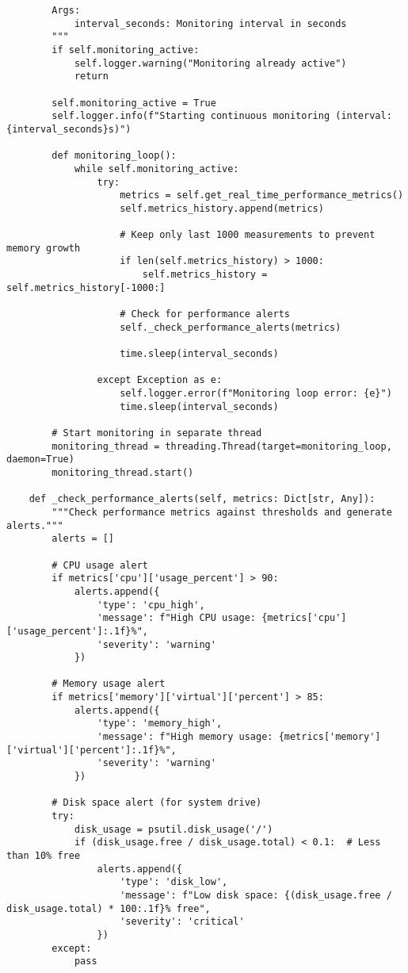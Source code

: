 \documentclass[12pt,a4paper]{article}
\begin{document}
\begin{verbatim}
        Args:
            interval_seconds: Monitoring interval in seconds
        """
        if self.monitoring_active:
            self.logger.warning("Monitoring already active")
            return
        
        self.monitoring_active = True
        self.logger.info(f"Starting continuous monitoring (interval: {interval_seconds}s)")
        
        def monitoring_loop():
            while self.monitoring_active:
                try:
                    metrics = self.get_real_time_performance_metrics()
                    self.metrics_history.append(metrics)
                    
                    # Keep only last 1000 measurements to prevent memory growth
                    if len(self.metrics_history) > 1000:
                        self.metrics_history = self.metrics_history[-1000:]
                    
                    # Check for performance alerts
                    self._check_performance_alerts(metrics)
                    
                    time.sleep(interval_seconds)
                    
                except Exception as e:
                    self.logger.error(f"Monitoring loop error: {e}")
                    time.sleep(interval_seconds)
        
        # Start monitoring in separate thread
        monitoring_thread = threading.Thread(target=monitoring_loop, daemon=True)
        monitoring_thread.start()
    
    def _check_performance_alerts(self, metrics: Dict[str, Any]):
        """Check performance metrics against thresholds and generate alerts."""
        alerts = []
        
        # CPU usage alert
        if metrics['cpu']['usage_percent'] > 90:
            alerts.append({
                'type': 'cpu_high',
                'message': f"High CPU usage: {metrics['cpu']['usage_percent']:.1f}%",
                'severity': 'warning'
            })
        
        # Memory usage alert
        if metrics['memory']['virtual']['percent'] > 85:
            alerts.append({
                'type': 'memory_high',
                'message': f"High memory usage: {metrics['memory']['virtual']['percent']:.1f}%",
                'severity': 'warning'
            })
        
        # Disk space alert (for system drive)
        try:
            disk_usage = psutil.disk_usage('/')
            if (disk_usage.free / disk_usage.total) < 0.1:  # Less than 10% free
                alerts.append({
                    'type': 'disk_low',
                    'message': f"Low disk space: {(disk_usage.free / disk_usage.total) * 100:.1f}% free",
                    'severity': 'critical'
                })
        except:
            pass
        

\end{verbatim}
\end{document}
